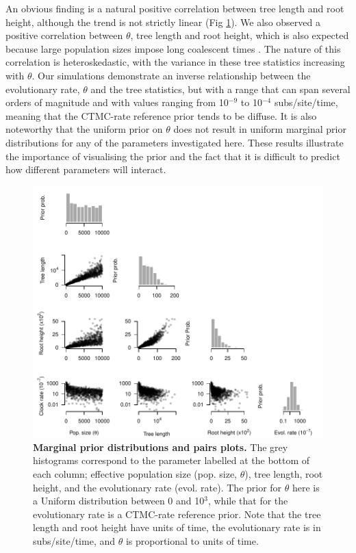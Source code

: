 \documentclass[10pt,letterpaper]{article}
\begin{document}
An obvious finding is a natural positive correlation between tree length and root height, although the trend is not strictly linear (Fig \ref{figure:correlation_plots}). We also observed a positive correlation between $\theta$, tree length and root height, which is also expected because large population sizes impose long coalescent times \cite{rosenberg2002genealogical}. The nature of this correlation is heteroskedastic, with the variance in these tree statistics increasing with $\theta$. Our simulations demonstrate an inverse relationship between the evolutionary rate, $\theta$ and the tree statistics, but with a range that can span several orders of magnitude and with values ranging from 10$^{-9}$ to 10$^{-4}$ subs/site/time, meaning that the CTMC-rate reference prior tends to be diffuse. It is also noteworthy that the uniform prior on $\theta$ does not result in uniform marginal prior distributions for any of the parameters investigated here. These results illustrate the importance of visualising the prior and the fact that it is difficult to predict how different parameters will interact.

\begin{figure}[!h]
		\begin{center}
		\includegraphics[width=14.7cm]{sandbox_figures/prior_predictive_plots.pdf}\newline
		\vspace{-0.5cm}
  \newline
		\caption{\textbf{Marginal prior distributions and pairs plots.} The grey histograms correspond to the parameter labelled at the bottom of each column; effective population size (pop. size, $\theta$), tree length, root height, and the evolutionary rate (evol. rate). The prior for $\theta$ here is a Uniform distribution between 0 and 10$^3$, while that for the evolutionary rate is a CTMC-rate reference prior. Note that the tree length and root height have units of time, the evolutionary rate is in subs/site/time, and $\theta$ is proportional to units of time. }
        \label{figure:correlation_plots}
		\end{center}
\end{figure}
\end{document}
